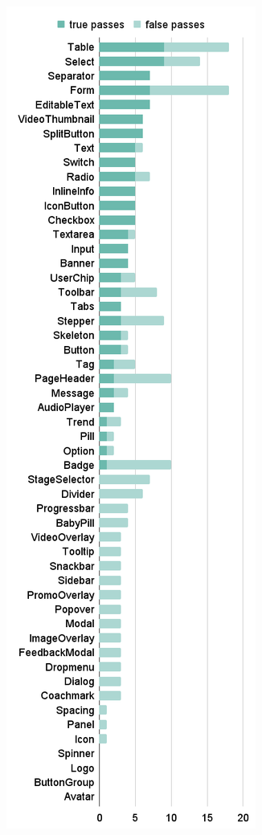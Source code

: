\documentclass{master_thesis}
\begin{document}
\begin{figure}[H]
\begin{subfigure}{0.24\textwidth}
	\label{fig:audit-failed}
	\end{subfigure}
	\begin{subfigure}{0.34\textwidth}
	\includegraphics[height=0.7\textheight]{img/audit-passed.png}

\end{subfigure}
\end{figure}
\end{document}
